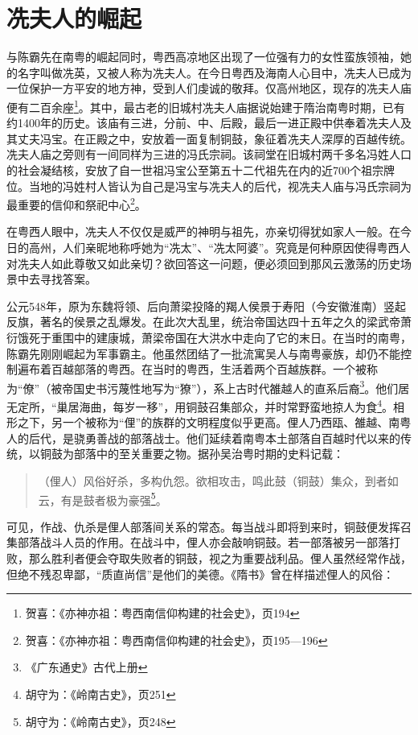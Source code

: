 \section{冼夫人的崛起}

\indent 与陈霸先在南粤的崛起同时，粤西高凉地区出现了一位强有力的女性蛮族领袖，她的名字叫做冼英，又被人称为冼夫人。在今日粤西及海南人心目中，冼夫人已成为一位保护一方平安的地方神，受到人们虔诚的敬拜。仅高州地区，现存的冼夫人庙便有二百余座\footnote{贺喜：《亦神亦祖：粤西南信仰构建的社会史》，页194}。其中，最古老的旧城村冼夫人庙据说始建于隋治南粤时期，已有约1400年的历史。该庙有三进，分前、中、后殿，最后一进正殿中供奉着冼夫人及其丈夫冯宝。在正殿之中，安放着一面复制铜鼓，象征着冼夫人深厚的百越传统。冼夫人庙之旁则有一间同样为三进的冯氏宗祠。该祠堂在旧城村两千多名冯姓人口的社会凝结核，安放了自一世祖冯宝公至第五十二代祖先在内的近700个祖宗牌位。当地的冯姓村人皆认为自己是冯宝与冼夫人的后代，视冼夫人庙与冯氏宗祠为最重要的信仰和祭祀中心\footnote{贺喜：《亦神亦祖：粤西南信仰构建的社会史》，页195—196}。

在粤西人眼中，冼夫人不仅仅是威严的神明与祖先，亦亲切得犹如家人一般。在今日的高州，人们亲昵地称呼她为“冼太”、“冼太阿婆”。究竟是何种原因使得粤西人对冼夫人如此尊敬又如此亲切？欲回答这一问题，便必须回到那风云激荡的历史场景中去寻找答案。

公元548年，原为东魏将领、后向萧梁投降的羯人侯景于寿阳（今安徽淮南）竖起反旗，著名的侯景之乱爆发。在此次大乱里，统治帝国达四十五年之久的梁武帝萧衍饿死于重围中的建康城，萧梁帝国在大洪水中走向了它的末日。在当时的南粤，陈霸先刚刚崛起为军事霸主。他虽然团结了一批流寓吴人与南粤豪族，却仍不能控制遍布着百越部落的粤西。在当时的粤西，生活着两个百越族群。一个被称为“僚”（被帝国史书污蔑性地写为“獠”），系上古时代雒越人的直系后裔\footnote{《广东通史》古代上册}。他们居无定所，“巢居海曲，每岁一移”，用铜鼓召集部众，并时常野蛮地掠人为食\footnote{胡守为：《岭南古史》，页251}。相形之下，另一个被称为“俚”的族群的文明程度似乎更高。俚人乃西瓯、雒越、南粤人的后代，是骁勇善战的部落战士。他们延续着南粤本土部落自百越时代以来的传统，以铜鼓为部落中的至关重要之物。据孙吴治粤时期的史料记载：

\begin{quote}
	（俚人）风俗好杀，多构仇怨。欲相攻击，鸣此鼓（铜鼓）集众，到者如云，有是鼓者极为豪强\footnote{胡守为：《岭南古史》，页248}。
\end{quote}


可见，作战、仇杀是俚人部落间关系的常态。每当战斗即将到来时，铜鼓便发挥召集部落战斗人员的作用。在战斗中，俚人亦会敲响铜鼓。若一部落被另一部落打败，那么胜利者便会夺取失败者的铜鼓，视之为重要战利品。俚人虽然经常作战，但绝不残忍卑鄙，“质直尚信”是他们的美德。《隋书》曾在样描述俚人的风俗：

